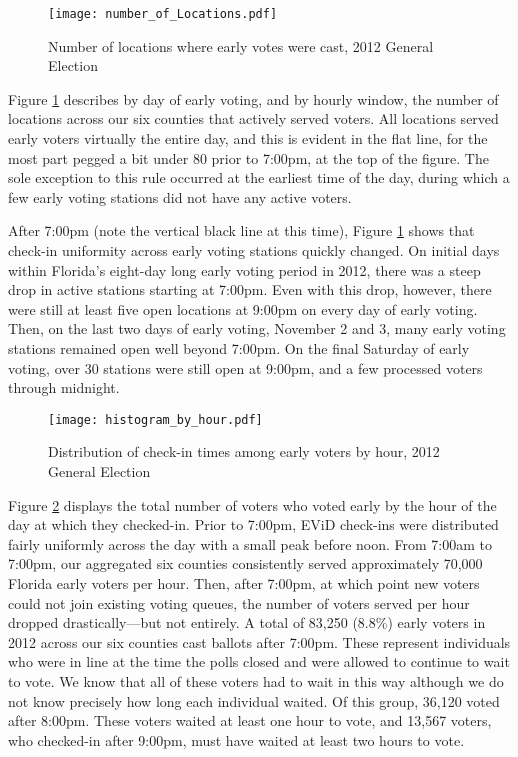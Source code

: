 \documentclass[12pt,titlepage]{article}
\begin{document}


\begin{figure}[!ht]
  \caption{Number of locations where early votes were cast, 2012 General Election}
  \label{fig:nrlocs2012}
  \centering
    \centering\texttt{[image: number\_of\_Locations.pdf]}
\end{figure}

Figure \ref{fig:nrlocs2012} describes by day of early voting, and by
hourly window, the number of locations across our six counties that
actively served voters.  All locations served early voters virtually
the entire day, and this is evident in the flat line, for the most
part pegged a bit under 80 prior to 7:00pm, at the top of the figure.
The sole exception to this rule occurred at the earliest time of the
day, during which a few early voting stations did not have any active
voters.

After 7:00pm (note the vertical black line at this time), Figure
\ref{fig:nrlocs2012} shows that check-in uniformity across early
voting stations quickly changed.  On initial days within Florida's
eight-day long early voting period in 2012, there was a steep drop in
active stations starting at 7:00pm.  Even with this drop, however,
there were still at least five open locations at 9:00pm on every day
of early voting.  Then, on the last two days of early voting, November
2 and 3, many early voting stations remained open well beyond 7:00pm.
On the final Saturday of early voting, over 30 stations were still
open at 9:00pm, and a few processed voters through midnight.

\begin{figure}[!ht]
\caption{Distribution of check-in times among early voters by hour, 2012 General Election}
  \label{fig:hist2012}
  \centering
    \centering\texttt{[image: histogram\_by\_hour.pdf]}
\end{figure}

Figure \ref{fig:hist2012} displays the total number of voters who
voted early by the hour of the day at which they checked-in. Prior to
7:00pm, EViD check-ins were distributed fairly uniformly across the
day with a small peak before noon.  From 7:00am to 7:00pm, our
aggregated six counties consistently served approximately 70,000
Florida early voters per hour. Then, after 7:00pm, at which point new
voters could not join existing voting queues, the number of voters
served per hour dropped drastically---but not entirely.  A total of
83,250 (8.8\%) early voters in 2012 across our six counties cast
ballots after 7:00pm. These represent individuals who were in line at
the time the polls closed and were allowed to continue to wait to
vote.  We know that all of these voters had to wait in this way
although we do not know precisely how long each individual waited.  Of
this group, 36,120 voted after 8:00pm.  These voters waited at least
one hour to vote, and 13,567 voters, who checked-in after 9:00pm, must
have waited at least two hours to vote.
\end{document}
